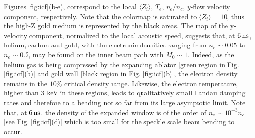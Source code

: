 \documentclass[%
 reprint,
 amsmath,amssymb,
 aps,
]{revtex4-1}
\begin{document}
Figures \ref{fig:icf}(b-e), correspond to the local $\langle Z_i\rangle$, $T_e$, $n_e/n_c$, $y$-flow velocity component, respectively. Note that the colormap is saturated to $\langle Z_i\rangle=10$,  thus the high-Z gold medium is represented by the black areas. The map of the y-velocity component, normalized to the local acoustic speed, suggests that, at $6\, \rm ns$, helium, carbon and gold, with the electronic densities ranging from $n_e\sim 0.05$ to $n_e\sim 0.2$, may be found on the inner beam path with $M_0\sim 1$. Indeed, as the helium gas is being compressed by the expanding  ablator [green region in Fig. \ref{fig:icf}(b)] and gold wall [black region in Fig. \ref{fig:icf}(b)],  the electron density remains in the $10\%$ critical density range. Likewise, the electron temperature, higher than $3$ keV in these regions, leads to qualitatively small Landau damping rates and  therefore to a bending not so far from its large asymptotic limit. 
Note that, at $6\,\rm  ns$, the density of the expanded window is of the order of $n_e\sim 10^{-3}n_c$  [see Fig. \ref{fig:icf}(d)]  which is too small for the speckle scale beam bending to occur.
\end{document}
